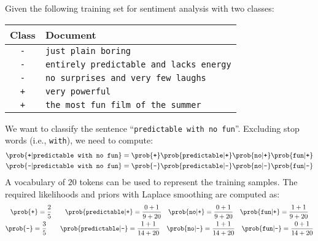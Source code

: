 \begin{example}
    Given the following training set for sentiment analysis with two classes:
    \begin{table}[H]
        \centering
        \footnotesize
        \begin{tabular}{cl}
            \toprule
            \textbf{Class} & \textbf{Document} \\
            \midrule
            \texttt{-} & \texttt{just plain boring} \\
            \texttt{-} & \texttt{entirely predictable and lacks energy} \\
            \texttt{-} & \texttt{no surprises and very few laughs} \\
            \texttt{+} & \texttt{very powerful} \\
            \texttt{+} & \texttt{the most fun film of the summer} \\
            \bottomrule
        \end{tabular}
    \end{table}
    We want to classify the sentence ``\texttt{predictable with no fun}''. Excluding stop words (i.e., \texttt{with}), we need to compute:
    \[
        \begin{split}
            \prob{\texttt{+} | \texttt{predictable with no fun}} &= \prob{\texttt{+}} \prob{\texttt{predictable} | \texttt{+}} \prob{\texttt{no} | \texttt{+}} \prob{\texttt{fun} | \texttt{+}} \\
            \prob{\texttt{-} | \texttt{predictable with no fun}} &= \prob{\texttt{-}} \prob{\texttt{predictable} | \texttt{-}} \prob{\texttt{no} | \texttt{-}} \prob{\texttt{fun} | \texttt{-}}
        \end{split}
    \]
    A vocabulary of $20$ tokens can be used to represent the training samples. The required likelihoods and priors with Laplace smoothing are computed as:
    \[
        \begin{gathered}
            \prob{\texttt{+}} = \frac{2}{5} \qquad \prob{\texttt{predictable} | \texttt{+}} = \frac{0+1}{9+20} \quad \prob{\texttt{no} | \texttt{+}} = \frac{0+1}{9+20} \quad \prob{\texttt{fun} | \texttt{+}} = \frac{1+1}{9+20} \\
            \prob{\texttt{-}} = \frac{3}{5} \qquad \prob{\texttt{predictable} | \texttt{-}} = \frac{1+1}{14+20} \quad \prob{\texttt{no} | \texttt{-}} = \frac{1+1}{14+20} \quad \prob{\texttt{fun} | \texttt{-}} = \frac{0+1}{14+20}
        \end{gathered}
    \]
\end{example}